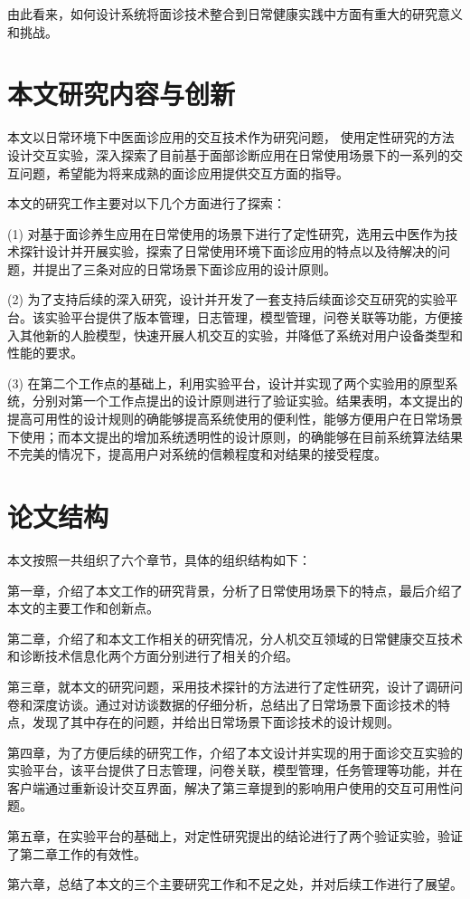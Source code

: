 
由此看来，如何设计系统将面诊技术整合到日常健康实践中方面有重大的研究意义和挑战。



\section{本文研究内容与创新}

本文以日常环境下中医面诊应用的交互技术作为研究问题，
使用定性研究的方法设计交互实验，深入探索了目前基于面部诊断应用在日常使用场景下的一系列的交互问题，希望能为将来成熟的面诊应用提供交互方面的指导。

本文的研究工作主要对以下几个方面进行了探索：

(1) 对基于面诊养生应用在日常使用的场景下进行了定性研究，选用云中医作为技术探针设计并开展实验，探索了日常使用环境下面诊应用的特点以及待解决的问题，并提出了三条对应的日常场景下面诊应用的设计原则。

(2) 为了支持后续的深入研究，设计并开发了一套支持后续面诊交互研究的实验平台。该实验平台提供了版本管理，日志管理，模型管理，问卷关联等功能，方便接入其他新的人脸模型，快速开展人机交互的实验，并降低了系统对用户设备类型和性能的要求。

(3) 在第二个工作点的基础上，利用实验平台，设计并实现了两个实验用的原型系统，分别对第一个工作点提出的设计原则进行了验证实验。结果表明，本文提出的提高可用性的设计规则的确能够提高系统使用的便利性，能够方便用户在日常场景下使用；而本文提出的增加系统透明性的设计原则，的确能够在目前系统算法结果不完美的情况下，提高用户对系统的信赖程度和对结果的接受程度。


\section{论文结构}
本文按照一共组织了六个章节，具体的组织结构如下：

第一章，介绍了本文工作的研究背景，分析了日常使用场景下的特点，最后介绍了本文的主要工作和创新点。

第二章，介绍了和本文工作相关的研究情况，分人机交互领域的日常健康交互技术和诊断技术信息化两个方面分别进行了相关的介绍。

第三章，就本文的研究问题，采用技术探针的方法进行了定性研究，设计了调研问卷和深度访谈。通过对访谈数据的仔细分析，总结出了日常场景下面诊技术的特点，发现了其中存在的问题，并给出日常场景下面诊技术的设计规则。

第四章，为了方便后续的研究工作，介绍了本文设计并实现的用于面诊交互实验的实验平台，该平台提供了日志管理，问卷关联，模型管理，任务管理等功能，并在客户端通过重新设计交互界面，解决了第三章提到的影响用户使用的交互可用性问题。

第五章，在实验平台的基础上，对定性研究提出的结论进行了两个验证实验，验证了第二章工作的有效性。

第六章，总结了本文的三个主要研究工作和不足之处，并对后续工作进行了展望。